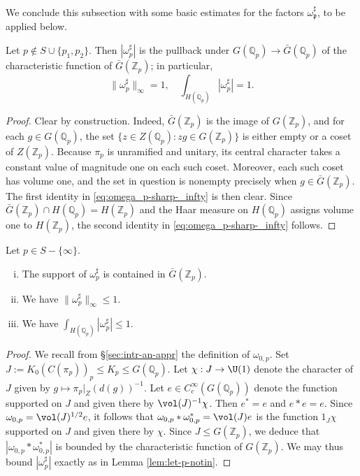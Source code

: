 We conclude this subsection with some basic estimates for the factors $\omega_\mathfrak{p} ^\sharp$, to be applied below.
\begin{lemma}\label{lem:let-p-notin}
  Let $p \notin S \cup \{p_1, p_2\}$.  Then $\left\lvert \omega_p^\sharp \right\rvert$ is the pullback under $G(\mathbb{Q}_p) \rightarrow \bar{G}(\mathbb{Q}_p)$ of the characteristic function of $\bar{G}(\mathbb{Z}_p)$; in particular,
  \begin{equation}\label{eq:omega_p-sharp-_infty}
    \|\omega_p^\sharp \|_{\infty} = 1, \quad \int_{H(\mathbb{Q}_p)} |\omega_p^\sharp| = 1.
  \end{equation}
\end{lemma}
\begin{proof}
  Clear by construction.  Indeed, $\bar{G}(\mathbb{Z}_p)$ is the image of $G(\mathbb{Z}_p)$, and for each $g \in G(\mathbb{Q}_p)$, the set $\{z \in Z(\mathbb{Q}_p) : z g \in G(\mathbb{Z}_p)\}$ is either empty or a coset of $Z(\mathbb{Z}_p)$.  Because $\pi_p$ is unramified and unitary, its central character takes a constant value of magnitude one on each such coset.  Moreover, each such coset has volume one, and the set in question is nonempty precisely when $g \in \bar{G}(\mathbb{Z}_p)$.  The first identity in \eqref{eq:omega_p-sharp-_infty} is then clear.  Since $\bar{G}(\mathbb{Z}_p) \cap H(\mathbb{Q}_p) = H(\mathbb{Z}_p)$ and the Haar measure on $H(\mathbb{Q}_p)$ assigns volume one to $H(\mathbb{Z}_p)$, the second identity in \eqref{eq:omega_p-sharp-_infty} follows.
\end{proof}
\begin{lemma}\label{lem:self-conv-omeg}
  Let $p \in S - \{\infty \}$.
  \begin{enumerate}[(i)]
  \item \label{item:self-conv-omeg-2}  The support of $\omega_p^\sharp$ is contained in $\bar{G}(\mathbb{Z}_p)$.
  \item \label{item:self-conv-omeg-1} We have $\|\omega_{p} ^\sharp\|_{\infty} \leq 1$.
  \item \label{item:self-conv-omeg-3}  We have $\int_{H(\mathbb{Q}_p)} |\omega_p^\sharp| \leq 1$.
  \end{enumerate}
\end{lemma}
\begin{proof}
  We recall from \S\ref{sec:intr-an-appr} the definition of $\omega_{0,p}$.  Set $J := K_0(C(\pi_p))_p \leq K_p \leq G(\mathbb{Q}_p)$.  Let $\chi : J \rightarrow \U(1)$ denote the character of $J$ given by $g \mapsto \pi_p|_{Z}(d(g))^{-1}$.  Let $e \in C_c^\infty(G(\mathbb{Q}_p))$ denote the function supported on $J$ and given there by $\vol(J)^{-1} \chi$.  Then $e^* = e$ and $e \ast e = e$.  Since $\omega_{0,p} = \vol(J)^{1/2} e$, it follows that $\omega_{0,p} \ast \omega_{0,p}^* = \vol(J) e$ is the function $1_J \chi$ supported on $J$ and given there by $\chi$.  Since $J \leq G(\mathbb{Z}_p)$, we deduce that $|\omega_{0,p} \ast \omega_{0,p}^*|$ is bounded by the characteristic function of $G(\mathbb{Z}_p)$.  We may thus bound $|\omega_p^\sharp|$ exactly as in Lemma \ref{lem:let-p-notin}.
\end{proof}
